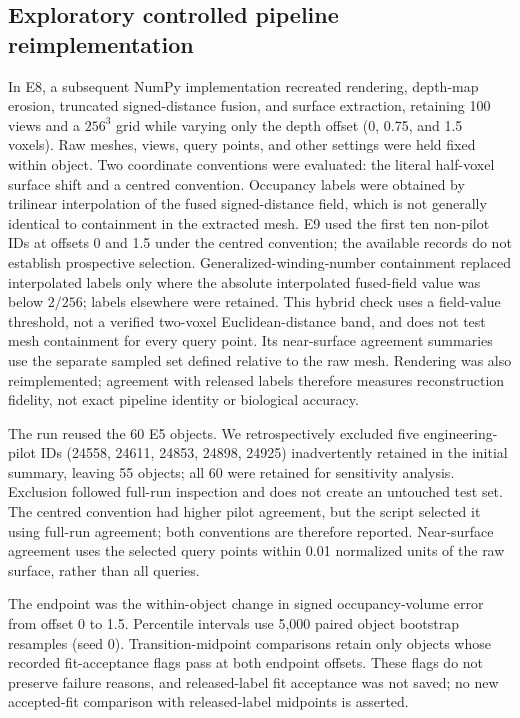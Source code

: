 \documentclass[journal]{IEEEtran}
\begin{document}
\subsection{Exploratory controlled pipeline reimplementation}

In E8, a subsequent NumPy implementation recreated rendering, depth-map erosion, truncated signed-distance fusion, and surface extraction, retaining 100 views and a $256^3$ grid while varying only the depth offset (0, 0.75, and 1.5 voxels). Raw meshes, views, query points, and other settings were held fixed within object. Two coordinate conventions were evaluated: the literal half-voxel surface shift and a centred convention. Occupancy labels were obtained by trilinear interpolation of the fused signed-distance field, which is not generally identical to containment in the extracted mesh. E9 used the first ten non-pilot IDs at offsets 0 and 1.5 under the centred convention; the available records do not establish prospective selection. Generalized-winding-number containment replaced interpolated labels only where the absolute interpolated fused-field value was below $2/256$; labels elsewhere were retained. This hybrid check uses a field-value threshold, not a verified two-voxel Euclidean-distance band, and does not test mesh containment for every query point. Its near-surface agreement summaries use the separate sampled set defined relative to the raw mesh. Rendering was also reimplemented; agreement with released labels therefore measures reconstruction fidelity, not exact pipeline identity or biological accuracy.

The run reused the 60 E5 objects. We retrospectively excluded five engineering-pilot IDs (24558, 24611, 24853, 24898, 24925) inadvertently retained in the initial summary, leaving 55 objects; all 60 were retained for sensitivity analysis. Exclusion followed full-run inspection and does not create an untouched test set. The centred convention had higher pilot agreement, but the script selected it using full-run agreement; both conventions are therefore reported. Near-surface agreement uses the selected query points within 0.01 normalized units of the raw surface, rather than all queries.

The endpoint was the within-object change in signed occupancy-volume error from offset 0 to 1.5. Percentile intervals use 5,000 paired object bootstrap resamples (seed 0). Transition-midpoint comparisons retain only objects whose recorded fit-acceptance flags pass at both endpoint offsets. These flags do not preserve failure reasons, and released-label fit acceptance was not saved; no new accepted-fit comparison with released-label midpoints is asserted.
\end{document}
